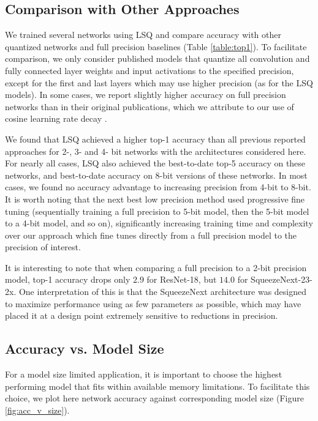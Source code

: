 \documentclass{article}
\begin{document}
\subsection{Comparison with Other Approaches}

We trained several networks using LSQ and compare accuracy with other quantized networks and full precision baselines (Table \ref{table:top1}).
%
To facilitate comparison, we only consider published models that quantize all convolution and fully connected layer weights and input activations to the specified precision, except for the first and last layers which may use higher precision (as for the LSQ models).
%
In some cases, we report slightly higher accuracy on full precision networks than in their original publications, which we attribute to our use of cosine learning rate decay \citep{DBLP:journals/corr/LoshchilovH16a}.


We found that LSQ achieved a higher top-1 accuracy than all previous reported approaches for 2-, 3- and 4- bit networks with the architectures considered here.
%
For nearly all cases, LSQ also achieved the best-to-date top-5 accuracy on these networks, and best-to-date accuracy on 8-bit versions of these networks.
%
In most cases, we found no accuracy advantage to increasing precision from 4-bit to 8-bit.
%
It is worth noting that the next best low precision method \citep{jung2018joint} used progressive fine tuning (sequentially training a full precision to 5-bit model, then the 5-bit model to a 4-bit model, and so on), significantly increasing training time and complexity over our approach which fine tunes directly from a full precision model to the precision of interest.


It is interesting to note that when comparing a full precision to a 2-bit precision model, top-1 accuracy drops only $2.9$ for ResNet-18, but $14.0$ for SqueezeNext-23-2x.
%
One interpretation of this is that the SqueezeNext architecture was designed to maximize performance using as few parameters as possible, which may have placed it at a design point extremely sensitive to reductions in precision.



\subsection{Accuracy vs. Model Size}

For a model size limited application, it is important to choose the highest performing model that fits within available memory limitations.  To facilitate this choice, we plot here network accuracy against corresponding model size (Figure \ref{fig:acc_v_size}).
\end{document}
